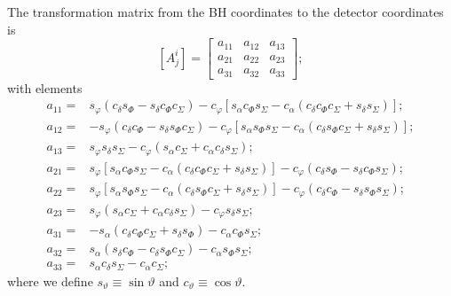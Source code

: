The transformation matrix from the BH coordinates to the detector coordinates is
\begin{equation}
\left[A^i_j\right] = \begin{bmatrix}
a_{11} & a_{12} & a_{13} \\
a_{21} & a_{22} & a_{23} \\
a_{31} & a_{32} & a_{33}
\end{bmatrix};
\end{equation}
with elements
\begin{align}
a_{11} = {} & s_\varphi\left(c_\delta s_\Phi - s_\delta c_\Phi c_\Sigma\right) - c_\varphi \left[s_\alpha c_\Phi s_\Sigma - c_\alpha \left(c_\delta c_\Phi c_\Sigma + s_\delta s_\Sigma\right)\right]; \\
a_{12} = {} & -s_\varphi\left(c_\delta c_\Phi - s_\delta s_\Phi c_\Sigma\right) - c_\varphi \left[s_\alpha s_\Phi s_\Sigma - c_\alpha \left(c_\delta s_\Phi c_\Sigma + s_\delta s_\Sigma\right)\right]; \\
a_{13} = {} & s_\varphi s_\delta s_\Sigma - c_\varphi\left(s_\alpha c_\Sigma + c_\alpha c_\delta s_\Sigma\right); \\
a_{21} = {} & s_\varphi\left[s_\alpha c_\Phi s_\Sigma - c_\alpha \left(c_\delta c_\Phi c_\Sigma + s_\delta s_\Sigma\right)\right] - c_\varphi \left(c_\delta s_\Phi - s_\delta c_\Phi s_\Sigma\right); \\
a_{22} = {} & s_\varphi\left[s_\alpha s_\Phi s_\Sigma - c_\alpha \left(c_\delta s_\Phi c_\Sigma + s_\delta s_\Sigma\right)\right] - c_\varphi \left(c_\delta c_\Phi - s_\delta s_\Phi s_\Sigma\right); \\
a_{23} = {} & s_\varphi\left(s_\alpha c_\Sigma + c_\alpha c_\delta s_\Sigma\right) - c_\varphi s_\delta s_\Sigma; \\
a_{31} = {} & -s_\alpha\left(c_\delta c_\Phi c_\Sigma + s_\delta s_\Phi\right) - c_\alpha c_\Phi s_\Sigma; \\
a_{32} = {} & s_\alpha\left(s_\delta c_\Phi - c_\delta s_\Phi c_\Sigma\right) - c_\alpha s_\Phi s_\Sigma; \\
a_{33} = {} & s_\alpha c_\delta s_\Sigma - c_\alpha c_\Sigma;
\end{align}
where we define $s_\vartheta \equiv \sin \vartheta$ and $c_\vartheta \equiv \cos \vartheta$.

